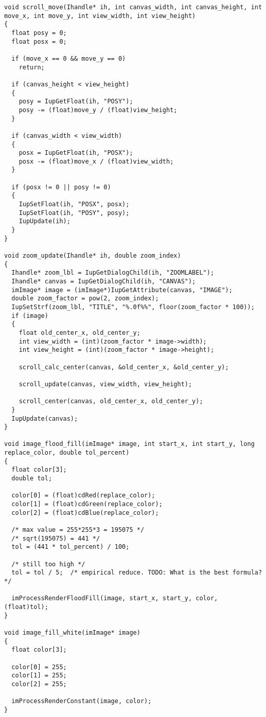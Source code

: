 \documentclass{ctexart}
\begin{document}
\begin{lstlisting}
void scroll_move(Ihandle* ih, int canvas_width, int canvas_height, int move_x, int move_y, int view_width, int view_height)
{
  float posy = 0;
  float posx = 0;

  if (move_x == 0 && move_y == 0)
    return;

  if (canvas_height < view_height)
  {
    posy = IupGetFloat(ih, "POSY");
    posy -= (float)move_y / (float)view_height;
  }

  if (canvas_width < view_width)
  {
    posx = IupGetFloat(ih, "POSX");
    posx -= (float)move_x / (float)view_width;
  }

  if (posx != 0 || posy != 0)
  {
    IupSetFloat(ih, "POSX", posx);
    IupSetFloat(ih, "POSY", posy);
    IupUpdate(ih);
  }
}

void zoom_update(Ihandle* ih, double zoom_index)
{
  Ihandle* zoom_lbl = IupGetDialogChild(ih, "ZOOMLABEL");
  Ihandle* canvas = IupGetDialogChild(ih, "CANVAS");
  imImage* image = (imImage*)IupGetAttribute(canvas, "IMAGE");
  double zoom_factor = pow(2, zoom_index);
  IupSetStrf(zoom_lbl, "TITLE", "%.0f%%", floor(zoom_factor * 100));
  if (image)
  {
    float old_center_x, old_center_y;
    int view_width = (int)(zoom_factor * image->width);
    int view_height = (int)(zoom_factor * image->height);

    scroll_calc_center(canvas, &old_center_x, &old_center_y);

    scroll_update(canvas, view_width, view_height);

    scroll_center(canvas, old_center_x, old_center_y);
  }
  IupUpdate(canvas);
}

void image_flood_fill(imImage* image, int start_x, int start_y, long replace_color, double tol_percent)
{
  float color[3];
  double tol;

  color[0] = (float)cdRed(replace_color);
  color[1] = (float)cdGreen(replace_color);
  color[2] = (float)cdBlue(replace_color);

  /* max value = 255*255*3 = 195075 */
  /* sqrt(195075) = 441 */
  tol = (441 * tol_percent) / 100;

  /* still too high */
  tol = tol / 5;  /* empirical reduce. TODO: What is the best formula? */

  imProcessRenderFloodFill(image, start_x, start_y, color, (float)tol);
}

void image_fill_white(imImage* image)
{
  float color[3];

  color[0] = 255;
  color[1] = 255;
  color[2] = 255;

  imProcessRenderConstant(image, color);
}


\end{lstlisting}
\end{document}
